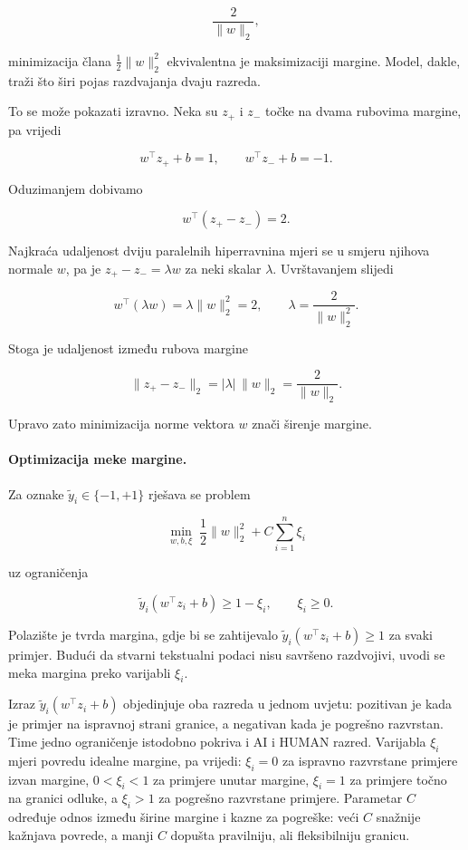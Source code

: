 \documentclass{article}
\begin{document}
\[
\frac{2}{\|w\|_2},
\]

minimizacija člana $\frac{1}{2}\|w\|_2^2$ ekvivalentna je maksimizaciji margine. Model, dakle, traži što širi pojas razdvajanja dvaju razreda.

To se može pokazati izravno. Neka su $z_+$ i $z_-$ točke na dvama rubovima margine, pa vrijedi

\[
w^\top z_+ + b = 1,
\qquad
w^\top z_- + b = -1.
\]

Oduzimanjem dobivamo

\[
w^\top (z_+ - z_-) = 2.
\]

Najkraća udaljenost dviju paralelnih hiperravnina mjeri se u smjeru njihova normale $w$, pa je $z_+ - z_- = \lambda w$ za neki skalar $\lambda$. Uvrštavanjem slijedi

\[
w^\top(\lambda w)=\lambda\|w\|_2^2=2,
\qquad
\lambda=\frac{2}{\|w\|_2^2}.
\]

Stoga je udaljenost između rubova margine

\[
\|z_+-z_-\|_2 = |\lambda|\,\|w\|_2 = \frac{2}{\|w\|_2}.
\]

Upravo zato minimizacija norme vektora $w$ znači širenje margine.

\paragraph{Optimizacija meke margine.}
Za oznake $\tilde y_i\in\{-1,+1\}$ rješava se problem

\[
\min_{w,b,\xi}\;\frac{1}{2}\|w\|_2^2 + C\sum_{i=1}^n \xi_i
\]

uz ograničenja

\[
\tilde y_i(w^\top z_i+b)\ge 1-\xi_i,
\qquad
\xi_i\ge 0.
\]

Polazište je tvrda margina, gdje bi se zahtijevalo $\tilde y_i(w^\top z_i+b)\ge 1$ za svaki primjer. Budući da stvarni tekstualni podaci nisu savršeno razdvojivi, uvodi se meka margina preko varijabli $\xi_i$.

Izraz $\tilde y_i(w^\top z_i+b)$ objedinjuje oba razreda u jednom uvjetu: pozitivan je kada je primjer na ispravnoj strani granice, a negativan kada je pogrešno razvrstan. Time jedno ograničenje istodobno pokriva i AI i HUMAN razred. Varijabla $\xi_i$ mjeri povredu idealne margine, pa vrijedi: $\xi_i=0$ za ispravno razvrstane primjere izvan margine, $0<\xi_i<1$ za primjere unutar margine, $\xi_i=1$ za primjere točno na granici odluke, a $\xi_i>1$ za pogrešno razvrstane primjere. Parametar $C$ određuje odnos između širine margine i kazne za pogreške: veći $C$ snažnije kažnjava povrede, a manji $C$ dopušta pravilniju, ali fleksibilniju granicu.
\end{document}
